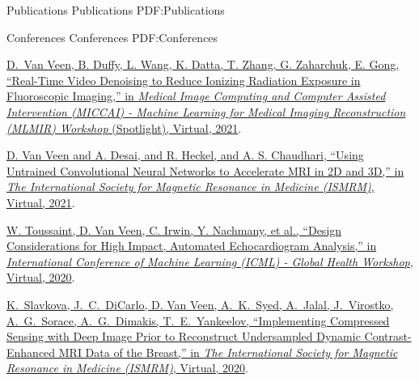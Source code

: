 \Section
{Publications}
{Publications}
{PDF:Publications}





\BigGap
\SubSection
{Conferences}
{Conferences}
{PDF:Conferences}

\begingroup

\Gap
\NumberedItem{[C5]}
\href{https://link.springer.com/chapter/10.1007/978-3-030-88552-6_11}
{\underline{D.~Van Veen}, B. Duffy, L. Wang, K. Datta, T. Zhang, G. Zaharchuk, E. Gong,
``Real-Time Video Denoising to Reduce Ionizing Radiation Exposure in Fluoroscopic Imaging,''
in \textit{Medical Image Computing and Computer Assisted Intervention (MICCAI) - Machine Learning for Medical Imaging Reconstruction (MLMIR) Workshop} (Spotlight), Virtual, 2021}.

\Gap
\NumberedItem{[C4]}
\href{https://index.mirasmart.com/ISMRM2021/PDFfiles/1964.html}
{\underline{D. Van Veen} and A. Desai, and R. Heckel, and A. S. Chaudhari,
``Using Untrained Convolutional Neural Networks to Accelerate MRI in 2D and 3D,''
in \textit{The International Society for Magnetic Resonance in Medicine (ISMRM)}, Virtual, 2021}.

\Gap
\NumberedItem{[C3]}
\href{https://arxiv.org/abs/2006.06292}
{W. Toussaint, \underline{D. Van Veen}, C. Irwin, Y. Nachmany, et al.,
``Design Considerations for High Impact, Automated Echocardiogram Analysis,''
in \textit{International Conference of Machine Learning (ICML) - Global Health Workshop}, Virtual, 2020}.

\Gap
\NumberedItem{[C2]}
\href{https://index.mirasmart.com/ISMRM2020/PDFfiles/2317.html}
{K.~Slavkova, J.~C.~DiCarlo, \underline{D. Van Veen}, A.~K.~Syed, A.~Jalal, J.~Virostko, A.~G.~Sorace, A.~G.~Dimakis, T.~E.~Yankeelov,
``Implementing Compressed Sensing with Deep Image Prior to Reconstruct Undersampled Dynamic Contrast-Enhanced MRI Data of the Breast,''
in \textit{The International Society for Magnetic Resonance in Medicine (ISMRM)}, Virtual, 2020}.

